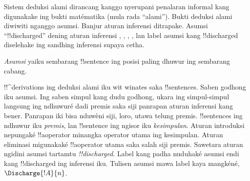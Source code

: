\documentclass[../../../include/open-logic-section]{subfiles}
\begin{document}
      {}
      {}


\begin{explain}
Sistem deduksi alami dirancang kanggo nyerupani penalaran informal
kang digunakake ing bukti matématika (mula rada ``alami'').
Bukti deduksi alami diwiwiti nganggo asumsi. Banjur aturan inferensi
ditrapake. Asumsi ``!!{discharged}'' dening aturan inferensi
\Intro{\lnot}, \Intro{\lif}, \FalseCl, , lan label asumsi kang
!!{discharged} diselehake ing sandhing inferensi supaya cetha.
\end{explain}

\begin{defn}[Asumsi]
\emph{Asumsi} yaiku sembarang !!{sentence}
ing posisi paling dhuwur ing sembarang cabang.
\end{defn}

!!^{derivation}s ing deduksi alami iku wit winates saka
!!{sentence}s. Saben godhong iku asumsi. Ing saben simpul kang dudu
godhong, ukara ing simpul-simpul langsung ing ndhuwuré dadi premis
saka siji panrapan aturan inferensi kang bener. Panrapan iki bisa
nduwèni siji, loro, utawa telung premis. !!{sentence}s ing ndhuwur
iku \emph{premis}, lan !!{sentence} ing ngisor iku
\emph{kesimpulan}. Aturan introduksi nepungaké !!a{operator}
minangka operator utama ing kesimpulan. Aturan eliminasi migunakaké
!!a{operator} utama saka salah siji premis. Sawetara aturan
ngidini asumsi tartamtu \emph{!!{discharged}}. Label kang padha
nuduhaké asumsi endi kang !!{discharged} ing inferensi iku. Tulisen
asumsi mawa label kaya mangkéné, $\Discharge{!A}{n}$.


\end{document}
